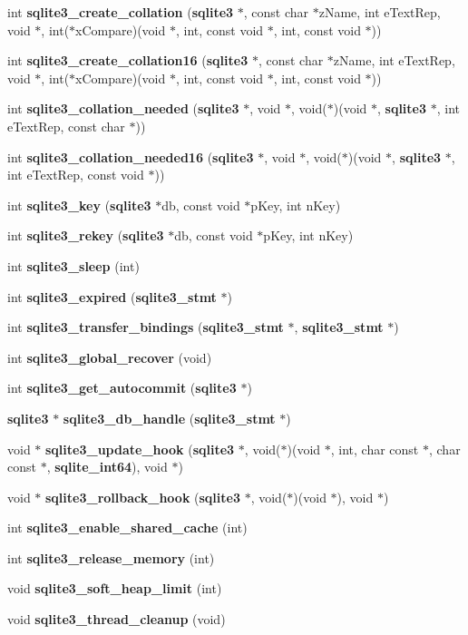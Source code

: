 \begin{DoxyCompactItemize}
\item 
int {\bf sqlite3\_\-create\_\-collation} ({\bf sqlite3} $\ast$, const char $\ast$zName, int eTextRep, void $\ast$, int($\ast$xCompare)(void $\ast$, int, const void $\ast$, int, const void $\ast$))
\item 
int {\bf sqlite3\_\-create\_\-collation16} ({\bf sqlite3} $\ast$, const char $\ast$zName, int eTextRep, void $\ast$, int($\ast$xCompare)(void $\ast$, int, const void $\ast$, int, const void $\ast$))
\item 
int {\bf sqlite3\_\-collation\_\-needed} ({\bf sqlite3} $\ast$, void $\ast$, void($\ast$)(void $\ast$, {\bf sqlite3} $\ast$, int eTextRep, const char $\ast$))
\item 
int {\bf sqlite3\_\-collation\_\-needed16} ({\bf sqlite3} $\ast$, void $\ast$, void($\ast$)(void $\ast$, {\bf sqlite3} $\ast$, int eTextRep, const void $\ast$))
\item 
int {\bf sqlite3\_\-key} ({\bf sqlite3} $\ast$db, const void $\ast$pKey, int nKey)
\item 
int {\bf sqlite3\_\-rekey} ({\bf sqlite3} $\ast$db, const void $\ast$pKey, int nKey)
\item 
int {\bf sqlite3\_\-sleep} (int)
\item 
int {\bf sqlite3\_\-expired} ({\bf sqlite3\_\-stmt} $\ast$)
\item 
int {\bf sqlite3\_\-transfer\_\-bindings} ({\bf sqlite3\_\-stmt} $\ast$, {\bf sqlite3\_\-stmt} $\ast$)
\item 
int {\bf sqlite3\_\-global\_\-recover} (void)
\item 
int {\bf sqlite3\_\-get\_\-autocommit} ({\bf sqlite3} $\ast$)
\item 
{\bf sqlite3} $\ast$ {\bf sqlite3\_\-db\_\-handle} ({\bf sqlite3\_\-stmt} $\ast$)
\item 
void $\ast$ {\bf sqlite3\_\-update\_\-hook} ({\bf sqlite3} $\ast$, void($\ast$)(void $\ast$, int, char const $\ast$, char const $\ast$, {\bf sqlite\_\-int64}), void $\ast$)
\item 
void $\ast$ {\bf sqlite3\_\-rollback\_\-hook} ({\bf sqlite3} $\ast$, void($\ast$)(void $\ast$), void $\ast$)
\item 
int {\bf sqlite3\_\-enable\_\-shared\_\-cache} (int)
\item 
int {\bf sqlite3\_\-release\_\-memory} (int)
\item 
void {\bf sqlite3\_\-soft\_\-heap\_\-limit} (int)
\item 
void {\bf sqlite3\_\-thread\_\-cleanup} (void)
\item 

\end{DoxyCompactItemize}
